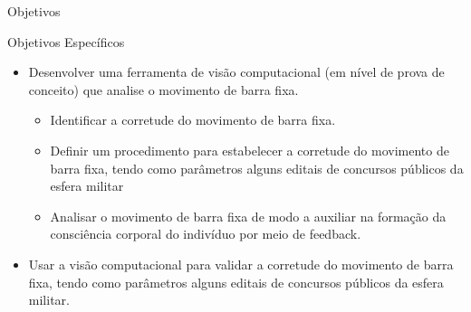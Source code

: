 \begin{frame}{Objetivos}
   
    \begin{block}{Objetivos Específicos}
        \begin{itemize}
            \item Desenvolver uma ferramenta de visão computacional (em nível de prova de conceito) que analise o movimento de barra fixa.
                \begin{itemize}
                    \item Identificar a corretude do movimento de barra fixa.
                    \item Definir um procedimento para estabelecer a corretude do movimento de barra fixa, tendo como parâmetros alguns editais de concursos públicos da esfera militar
                    \item Analisar o movimento de barra fixa de modo a auxiliar na formação da consciência corporal do indivíduo por meio de feedback.
                \end{itemize}
            \item Usar a visão computacional para validar a corretude do movimento de barra fixa, tendo como parâmetros alguns editais de concursos públicos da esfera militar.
        \end{itemize}
    \end{block}

\end{frame}




